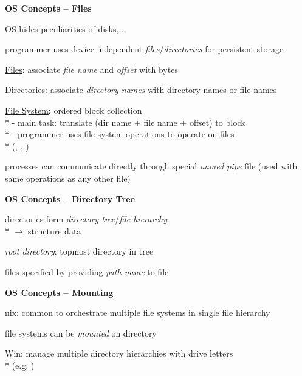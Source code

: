 \newpage

\textbf{OS Concepts -- Files}
\begin{items}
	\item OS hides peculiarities of disks,...
	\item programmer uses device-independent \emph{files}/\emph{directories} for persistent storage
	\item \underline{Files}: associate \emph{file name} and \emph{offset} with bytes
	\item \underline{Directories}: associate \emph{directory names} with directory names or file names
	\item \underline{File System}: ordered block collection \\*
		- main task: translate (dir name + file name + offset) to block \\*
		- programmer uses file system operations to operate on files \\* \phantom{-} (, , )
	\item processes can communicate directly through special \emph{named pipe} file (used with same operations as any other file)
\end{items}

\textbf{OS Concepts -- Directory Tree}
\begin{items}
	\item directories form \emph{directory tree}/\emph{file hierarchy} \\*
		\( \to \) structure data
	\item \emph{root directory}: topmost directory in tree
	\item files specified by providing \emph{path name} to file
\end{items}

\textbf{OS Concepts -- Mounting}
\begin{items}
	\item *nix: common to orchestrate multiple file systems in single file hierarchy
	\item file systems can be \emph{mounted} on directory
	\item Win: manage multiple directory hierarchies with drive letters
		\\*
		(e.g. )
\end{items}

